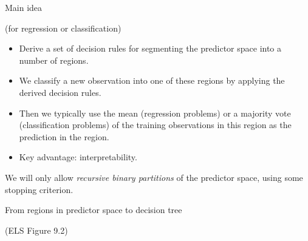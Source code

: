 \documentclass[
  ignorenonframetext,
]{beamer}
\providecommand{\tightlist}{%
  \setlength{\itemsep}{0pt}\setlength{\parskip}{0pt}}
\begin{document}
\begin{frame}

\begin{block}{Main idea}

(for regression or classification)

\begin{itemize}
\tightlist
\item
  Derive a set of decision rules for segmenting the predictor space into
  a number of regions.
\item
  We classify a new observation into one of these regions by applying
  the derived decision rules.
\item
  Then we typically use the mean (regression problems) or a majority
  vote (classification problems) of the training observations in this
  region as the prediction in the region.
\item
  Key advantage: interpretability.
\end{itemize}

We will only allow \emph{recursive binary partitions} of the predictor
space, using some stopping criterion.

\end{block}

\end{frame}

\begin{frame}

\begin{block}{From regions in predictor space to decision tree}

\end{block}

\end{frame}

\begin{frame}

(ELS Figure 9.2)

\end{frame}
\end{document}

